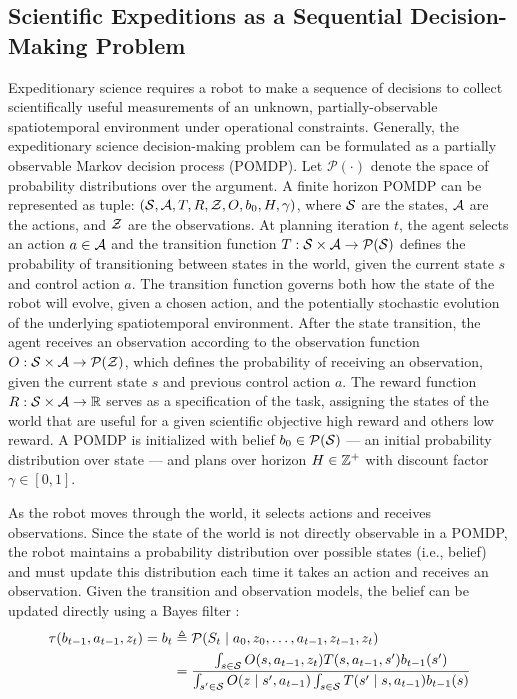 \subsection{Scientific Expeditions as a Sequential Decision-Making Problem}
Expeditionary science requires a robot to make a sequence of decisions to collect scientifically useful measurements of an unknown, partially-observable spatiotemporal environment under operational constraints. Generally, the expeditionary science decision-making problem can be formulated as a partially observable Markov decision process (POMDP). Let $\mathcal{P}(\cdot)$ denote the space of probability distributions over the argument. A finite horizon POMDP can be represented as tuple: $(\mathcal{S}, \mathcal{A}, T, R, \mathcal{Z}, O, b_0, H, \gamma)$, where $\mathcal{S}$ are the states, $\mathcal{A}$ are the actions, and $\mathcal{Z}$ are the observations. At planning iteration $t$, the agent selects an action $a \in \mathcal{A}$ and the transition function $T: \mathcal{S} \times \mathcal{A} \to \mathcal{P}(\mathcal{S})$ defines the probability of transitioning between states in the world, given the current state $s$ and control action $a$. The transition function governs both how the state of the robot will evolve, given a chosen action, and the potentially stochastic evolution of the underlying spatiotemporal environment. After the state transition, the agent receives an observation according to the observation function $O: \mathcal{S} \times \mathcal{A} \to \mathcal{P}(\mathcal{Z})$, which defines the probability of receiving an observation, given the current state $s$ and previous control action $a$. The reward function $R: \mathcal{S} \times \mathcal{A} \to \mathbb{R}$ serves as a specification of the task, assigning the states of the world that are useful for a given scientific objective high reward and others low reward. A POMDP is initialized with belief $b_0 \in \mathcal{P}(\mathcal{S})$ --- an initial probability distribution over state --- and plans over horizon $H \in \mathbb{Z}^+$ with discount factor $\gamma \in [0, 1]$.

As the robot moves through the world, it selects actions and receives observations. Since the state of the world is not directly observable in a POMDP, the robot maintains a probability distribution over possible states (i.e., belief) and must update this distribution each time it takes an action and receives an observation. Given the transition and observation models, the belief can be updated directly using a Bayes filter \autocite{sarkka2013bayesian}:
\begin{align}
    \tau(b_{t-1}, a_{t-1}, z_t) = b_t
        &\triangleq \mathcal{P}(S_t \mid a_0, z_0, \dots, a_{t-1}, z_{t-1}, z_t) \\
        &= \frac{\int_{s \in \mathcal{S}} O(s, a_{t-1}, z_t) T(s, a_{t-1}, s')b_{t-1}(s')}{\int_{s' \in \mathcal{S}} O(z \mid s', a_{t-1}) \int_{s \in \mathcal{S}} T(s' \mid s, a_{t-1})b_{t-1}(s)}
    \label{eq:bayes_tau}
\end{align}


